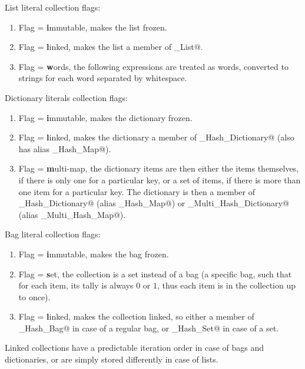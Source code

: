List literal collection flags: 

\begin{enumerate}
\item Flag \lstinline@i@ = \textbf{i}mmutable, makes the list frozen. 
\item Flag \lstinline@l@ = \textbf{l}inked, makes the list a member of \lstinline@Linked_List@. 
\item Flag \lstinline@w@ = \textbf{w}ords, the following expressions are treated as words, converted to strings for each word separated by whitespace. 
\end{enumerate}

Dictionary literals collection flags:

\begin{enumerate}
\item Flag \lstinline@i@ = \textbf{i}mmutable, makes the dictionary frozen. 
\item Flag \lstinline@l@ = \textbf{l}inked, makes the dictionary a member of \lstinline@Linked_Hash_Dictionary@ (also has alias \lstinline@Linked_Hash_Map@).
\item Flag \lstinline@m@ = \textbf{m}ulti-map, the dictionary items are then either the items themselves, if there is only one for a particular key, or a set of items, if there is more than one item for a particular key. The dictionary is then a member of \lstinline@Multi_Hash_Dictionary@ (alias \lstinline@Multi_Hash_Map@) or \lstinline@Linked_Multi_Hash_Dictionary@ (alias \lstinline@Linked_Multi_Hash_Map@). 
\end{enumerate}

Bag literal collection flags:

\begin{enumerate}
\item Flag \lstinline@i@ = \textbf{i}mmutable, makes the bag frozen. 
\item Flag \lstinline@s@ = \textbf{s}et, the collection is a set instead of a bag (a specific bag, such that for each item, its tally is always $0$ or $1$, thus each item is in the collection up to once). 
\item Flag \lstinline@l@ = \textbf{l}inked, makes the collection linked, so either a member of \lstinline@Linked_Hash_Bag@ in case of a regular bag, or \lstinline@Linked_Hash_Set@ in case of a set. 
\end{enumerate}

Linked collections have a predictable iteration order in case of bags and dictionaries, or are simply stored differently in case of lists. 

